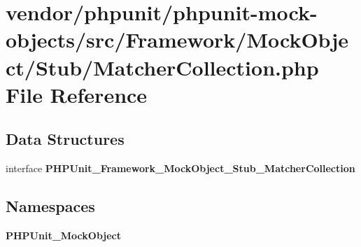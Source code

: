 \section{vendor/phpunit/phpunit-\/mock-\/objects/src/\+Framework/\+Mock\+Object/\+Stub/\+Matcher\+Collection.php File Reference}
\label{_matcher_collection_8php}
\subsection*{Data Structures}
\begin{DoxyCompactItemize}
\item 
interface {\bf P\+H\+P\+Unit\+\_\+\+Framework\+\_\+\+Mock\+Object\+\_\+\+Stub\+\_\+\+Matcher\+Collection}
\end{DoxyCompactItemize}
\subsection*{Namespaces}
\begin{DoxyCompactItemize}
\item 
 {\bf P\+H\+P\+Unit\+\_\+\+Mock\+Object}
\end{DoxyCompactItemize}
